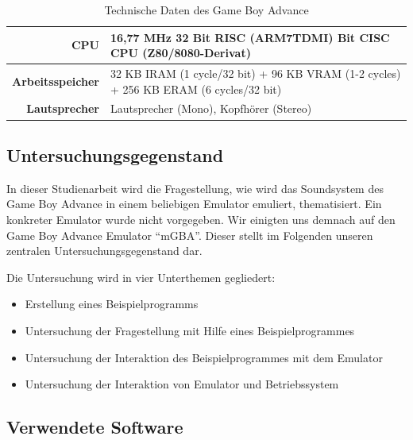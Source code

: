 \documentclass[11pt,a4paper]{scrartcl}
\begin{document}
\begin{table}[h]
    \centering
    \begin{tabular}{ r | p{10cm} }
        \textbf{CPU} & 16,77 MHz 32 Bit RISC (ARM7TDMI)\newline
              8 Bit CISC CPU (Z80/8080-Derivat) \\
        \hline
        \textbf{Arbeitsspeicher} & 32 KB IRAM (1 cycle/32 bit)\newline
                          + 96 KB VRAM (1-2 cycles)\newline
                          + 256 KB ERAM (6 cycles/32 bit) \\
        \hline
        \textbf{Lautsprecher} & Lautsprecher (Mono), Kopfh\"orer (Stereo) \\
    \end{tabular}
    \caption{Technische Daten des Game Boy Advance\cite{GameBoyTechnischeDaten}}
    \label{table:TechnischeDaten}
\end{table}

\newpage

\subsection{Untersuchungsgegenstand}

In dieser Studienarbeit wird die Fragestellung, wie wird das Soundsystem des Game Boy Advance in einem beliebigen Emulator emuliert, thematisiert. Ein konkreter Emulator wurde nicht vorgegeben. Wir einigten uns demnach auf den Game Boy Advance Emulator \enquote{mGBA}. Dieser stellt im Folgenden unseren zentralen Untersuchungsgegenstand dar.

Die Untersuchung wird in vier Unterthemen gegliedert:

\begin{itemize}
    \item Erstellung eines Beispielprogramms
    \item Untersuchung der Fragestellung mit Hilfe eines Beispielprogrammes
    \item Untersuchung der Interaktion des Beispielprogrammes mit dem Emulator
    \item Untersuchung der Interaktion von Emulator und Betriebssystem
\end{itemize}

\subsection{Verwendete Software}
\end{document}
